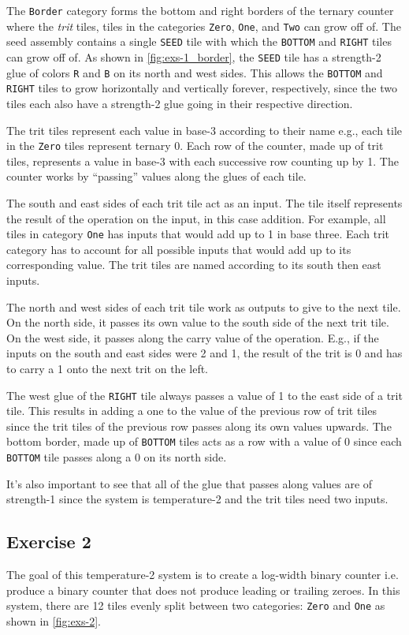 \documentclass[11pt]{article}
\begin{document}
The \verb|Border| category forms the bottom and right borders of the ternary counter where the
\textit{trit} tiles, tiles in the categories \verb|Zero|, \verb|One|, and \verb|Two| can grow off
of. The seed assembly contains a single \verb|SEED| tile with which the \verb|BOTTOM| and
\verb|RIGHT| tiles can grow off of. As shown in \cref{fig:exs-1_border}, the \verb|SEED| tile has a
strength-2 glue of colors \verb|R| and \verb|B| on its north and west sides. This allows the
\verb|BOTTOM| and \verb|RIGHT| tiles to grow horizontally and vertically forever, respectively,
since the two tiles each also have a strength-2 glue going in their respective direction.

The trit tiles represent each value in base-3 according to their name e.g., each tile in the
\verb|Zero| tiles represent ternary 0. Each row of the counter, made up of trit tiles, represents a
value in base-3 with each successive row counting up by 1. The counter works by ``passing'' values
along the glues of each tile. 

The south and east sides of each trit tile act as an input. The tile itself represents the result of
the operation on the input, in this case addition. For example, all tiles in category \verb|One| has
inputs that would add up to 1 in base three. Each trit category has to account for all possible
inputs that would add up to its corresponding value. The trit tiles are named according to its south
then east inputs.

The north and west sides of each trit tile work as outputs to give to the next tile. On the north
side, it passes its own value to the south side of the next trit tile. On the west side, it passes
along the carry value of the operation. E.g., if the inputs on the south and east sides were 2 and
1, the result of the trit is 0 and has to carry a 1 onto the next trit on the left.

The west glue of the \verb|RIGHT| tile always passes a value of 1 to the east side of a trit tile.
This results in adding a one to the value of the previous row of trit tiles since the trit
tiles of the previous row passes along its own values upwards. The bottom border, made up of
\verb|BOTTOM| tiles acts as a row with a value of 0 since each \verb|BOTTOM| tile passes along a 0
on its north side.

It's also important to see that all of the glue that passes along values are of strength-1 since the
system is temperature-2 and the trit tiles need two inputs.

\subsection*{Exercise 2} 
The goal of this temperature-2 system is to create a log-width binary counter i.e. produce a binary
counter that does not produce leading or trailing zeroes. In this system, there are 12 tiles evenly
split between two categories: \verb|Zero| and \verb|One| as shown in \cref{fig:exs-2}.
\end{document}
